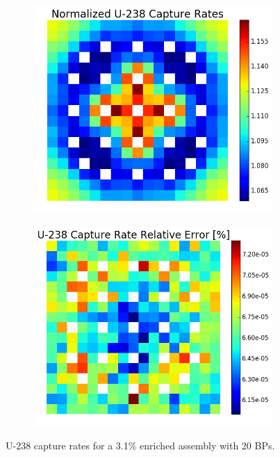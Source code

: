 \begin{figure}[h!]
\centering
\begin{subfigure}{0.5\textwidth}
  \centering
  \includegraphics[width=\linewidth]{figures/benchmarks/capture-rates/capt-mean-fuel-31-20BAs}
  \caption{}
  \label{fig:chap7-capt-rate-mean-3.1-20BAs-assm}
\end{subfigure}%
\begin{subfigure}{0.5\textwidth}
  \centering
  \includegraphics[width=\linewidth]{figures/benchmarks/capture-rates/capt-rel-err-fuel-31-20BAs}
  \caption{}
  \label{fig:chap7-capt-rate-rel-err-3.1-20BAs-assm}
\end{subfigure}%
\caption[U-238 capture rates for a 3.1\% enriched assembly with 20 BPs]{U-238 capture rates for a 3.1\% enriched assembly with 20 \ac{BP}s.}
\label{fig:chap7-capt-rates-3.1-assm-20BAs}
\end{figure}

